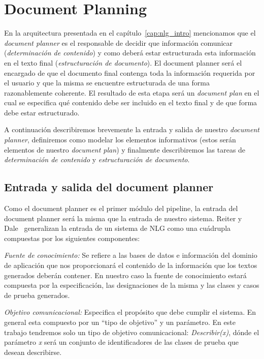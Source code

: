 \chapter{Document Planning}

En la arquitectura presentada en el capítulo~\ref{cap:nlg_intro} mencionamos que el \emph{document planner} es el responsable de decidir que información comunicar (\emph{determinación de contenido}) y como deberá estar estructurada esta información en el texto final (\emph{estructuración de documento}). El document planner será el encargado de que el documento final contenga toda la información requerida por el usuario y que la misma se encuentre estructurada de una forma razonablemente coherente. El resultado de esta etapa será un \emph{document plan} en el cual se especifica qué contenido debe ser incluido en el texto final y de que forma debe estar estructurado.


A continuación describiremos brevemente la entrada y salida de nuestro \emph{document planner}, definiremos como modelar los elementos informativos (estos serán elementos de nuestro \emph{document plan}) y finalmente describiremos las tareas de \emph{determinación de contenido} y \emph{estructuración de documento}.

\section{Entrada y salida del document planner}
Como el document planner es el primer módulo del pipeline, la entrada del document planner será la misma que la entrada de nuestro sistema. Reiter y Dale~\cite{reiter_dale} generalizan la entrada de un sistema de NLG  como una cuádrupla compuestas por los siguientes componentes:

\bigskip
\noindent
\emph{Fuente de conocimiento:} Se refiere a las bases de datos e información del dominio de aplicación que nos proporcionará el contenido de la información que los textos generados deberán contener.
En nuestro caso la fuente de conocimiento estará compuesta por la especificación, las designaciones de la misma y las clases y casos de prueba generados.

\bigskip
\noindent
\emph{Objetivo comunicacional:} Especifica el propósito que debe cumplir el sistema. En general esta compuesto por un ``tipo de objetivo'' y un parámetro.
En este trabajo tendremos solo un tipo de objetivo comunicacional: \emph{Describir(x)}, dónde el parámetro \emph{x} será un conjunto de identificadores de las clases de prueba que desean describirse.

